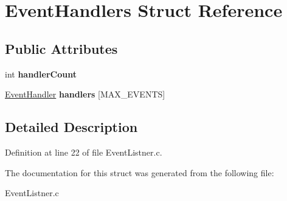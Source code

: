 \hypertarget{structEventHandlers}{
\section{EventHandlers Struct Reference}
\label{structEventHandlers}
}
\subsection*{Public Attributes}
\begin{DoxyCompactItemize}
\item 
\hypertarget{structEventHandlers_a44fbc1c148c4e0451eb04e05517bf900}{
int {\bfseries handlerCount}}
\label{structEventHandlers_a44fbc1c148c4e0451eb04e05517bf900}

\item 
\hypertarget{structEventHandlers_afe3bc47b9269c19ff5e4867386c060bd}{
\hyperlink{structEventHandler}{EventHandler} {\bfseries handlers} \mbox{[}MAX\_\-EVENTS\mbox{]}}
\label{structEventHandlers_afe3bc47b9269c19ff5e4867386c060bd}

\end{DoxyCompactItemize}


\subsection{Detailed Description}


Definition at line 22 of file EventListner.c.



The documentation for this struct was generated from the following file:\begin{DoxyCompactItemize}
\item 
EventListner.c\end{DoxyCompactItemize}
